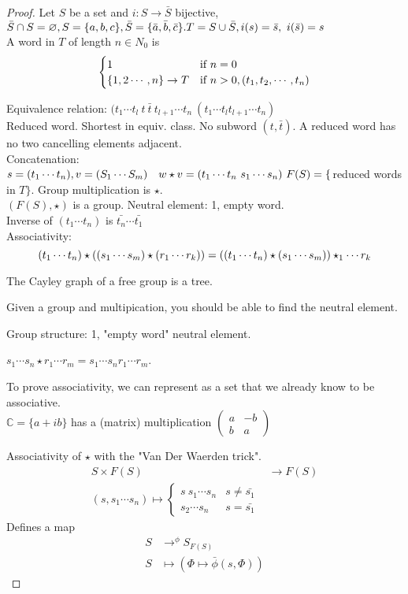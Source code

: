 \documentclass{article}
\let\nset\varnothing
\let\ddd\cdots
\newcommand{\C}{\mathbb{C}}
\theoremstyle{definition}
\theoremstyle{remark}
\theoremstyle{example}
\begin{document}
	\begin{proof}
		Let $S$ be a set and $i:S \to \bar{S}$ bijective,\\
		$\bar{S} \cap S = \nset, S=\{a,b,c\}, \bar{S}=\{\bar{a},\bar{b}, \bar{c}\}.\\
		T=S \cup \bar{S}, i(s)=\bar{s},\ i(\bar{s})=s$\\
		A word in $T$ of length $n \in N_0$ is \[
		\begin{cases}
			1 & $if\ $ n=0\\
			\{1,2\ddd,n\} \to T & $if\ $ n>0, (t_1,t_2,\ddd,t_n)
		\end{cases} \]
		
		Equivalence relation:
		$(t_1 \ddd t_l \ t \ \bar{t}\  t_{l+1} \ddd t_n ~ (t_1 \ddd t_l t_{l+1} \ddd t_n)$\\
		Reduced word. Shortest in equiv. class. No subword $(t,\bar{t})$. A reduced word has no two cancelling elements adjacent.\\
		Concatenation:
		$s=(t_1 \ddd t_n), v=(S_1 \ddd S_m)\quad
		w \star v = (t_1 \ddd t_n \ s_1 \ddd s_n)\\\
		F(S)=\{$reduced words in $T\}$. Group multiplication is $\star$.\\
		$(F(S),\star)$ is a group.
		Neutral element: 1, empty word.\\
		Inverse of $(t_1 \ddd t_n)$ is $\bar{t_n} \ddd \bar{t_1}$\\
		Associativity:
		\[(t_1 \ddd t_n) \star ((s_1 \ddd s_m) \star (r_1 \ddd r_k))\\
		=((t_1 \ddd t_n) \star(s_1 \ddd s_m)) \star_1 \ddd r_k\]
	
		The Cayley graph of a free group is a tree.
		
		Given a group and multipication, you should be able to find the neutral element.
		
		Group structure: 1, "empty word" neutral element.
		
		$s_1 \ddd s_n \star r_1 \ddd r_m = s_1 \ddd s_n r_1 \ddd r_m$.
		
		To prove associativity, we can represent as a set that we already know to be associative.\\
		$\C = \{a+ib\}$ has a (matrix) multiplication $
		\begin{pmatrix}
			a & -b\\
			b & a
		\end{pmatrix}
		$
		
		Associativity of $\star$ with the "Van Der Waerden trick".\\
		\begin{align*}
			S \times F(S) & \to F(S)\\
			(s,s_1 \ddd s_n) \mapsto \begin{cases}
				s \ s_1 \ddd s_n & s \neq \bar{s_1}\\
				s_2 \ddd s_n & s = \bar{s_1}
			\end{cases}
		\end{align*}
		Defines a map \begin{align*}
			S & \to^\phi S_{F(S)}\\
			S & \mapsto (\Phi \mapsto \bar{\phi}(s, \Phi))
		\end{align*}
		

\end{proof}
\end{document}
